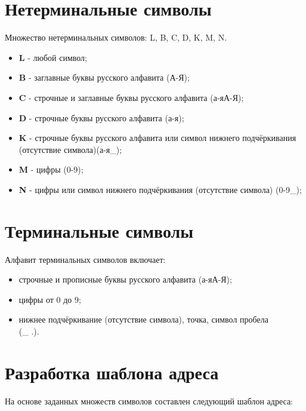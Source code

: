\documentclass[oneside,a4paper,14pt]{extarticle}
\begin{document}
\section*{Нетерминальные символы}
Множество нетерминальных символов: L, B, C, D, K, M, N.
\begin{itemize}
	\item \textbf{L} - любой символ;
	\item \textbf{B} - заглавные буквы русского алфавита (А-Я);
	\item \textbf{C} - строчные и заглавные буквы русского алфавита (а-яА-Я);
	\item \textbf{D} - строчные буквы русского алфавита (а-я);
	\item \textbf{K} - строчные буквы русского алфавита или символ нижнего подчёркивания (отсутствие символа)(а-я\_);
	\item \textbf{M} - цифры (0-9);
	\item \textbf{N} - цифры или символ нижнего подчёркивания (отсутствие символа) (0-9\_);
\end{itemize}

\section*{Терминальные символы}
Алфавит терминальных символов включает:
\begin{itemize}
	\item строчные и прописные буквы русского алфавита (а-яА-Я);
	\item цифры от 0 до 9;
	\item нижнее подчёркивание (отсутствие символа), точка, символ пробела\\ (\_ .\textvisiblespace).
\end{itemize}

\section*{Разработка шаблона адреса}
На основе заданных множеств символов составлен следующий шаблон адреса:
\end{document}
